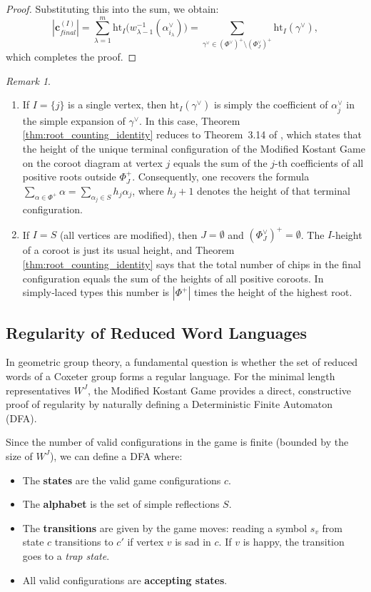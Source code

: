 \documentclass[11pt,a4paper]{amsart}
\theoremstyle{plain}
\theoremstyle{definition}
\theoremstyle{remark}
\newtheorem{remark}[theorem]{Remark}
\begin{document}
\begin{proof}
    Substituting this into the sum, we obtain:
    \[
    |\mathbf{c}_{final}^{(I)}| = \sum_{\lambda=1}^m \mathrm{ht}_I\bigl(w_{\lambda-1}^{-1}(\alpha_{i_\lambda}^\vee)\bigr) 
    = \sum_{\gamma^\vee \in (\Phi^\vee)^+ \setminus (\Phi_J^\vee)^+} \mathrm{ht}_I(\gamma^\vee),
    \]
    which completes the proof.
\end{proof}

\begin{remark}
    \label{rem:root_counting_special_cases}
    \begin{enumerate}
        \item If $I = \{j\}$ is a single vertex, then $\mathrm{ht}_I(\gamma^\vee)$ is simply the coefficient of $\alpha_j^\vee$ in the simple expansion of $\gamma^\vee$. In this case, Theorem \ref{thm:root_counting_identity} reduces to Theorem~3.14 of \cite{CaviedesCastro2022}, which states that the height of the unique terminal configuration of the Modified Kostant Game on the coroot diagram at vertex $j$ equals the sum of the $j$-th coefficients of all positive roots outside $\Phi_J^+$. Consequently, one recovers the formula $\sum_{\alpha \in \Phi^+} \alpha = \sum_{\alpha_j \in S} h_j \alpha_j$, where $h_j+1$ denotes the height of that terminal configuration.
        \item If $I = S$ (all vertices are modified), then $J = \emptyset$ and $(\Phi_J^\vee)^+ = \emptyset$. The $I$-height of a coroot is just its usual height, and Theorem \ref{thm:root_counting_identity} says that the total number of chips in the final configuration equals the sum of the heights of all positive coroots. In simply‑laced types this number is $|\Phi^+|$ times the height of the highest root.
    \end{enumerate}
\end{remark}

\subsection{Regularity of Reduced Word Languages}

In geometric group theory, a fundamental question is whether the set of reduced words of a Coxeter group forms a regular language. For the minimal length representatives $W^J$, the Modified Kostant Game provides a direct, constructive proof of regularity by naturally defining a Deterministic Finite Automaton (DFA).

Since the number of valid configurations in the game is finite (bounded by the size of $W^J$), we can define a DFA where:
\begin{itemize}
	\item The \textbf{states} are the valid game configurations $c$.
	\item The \textbf{alphabet} is the set of simple reflections $S$.
	\item The \textbf{transitions} are given by the game moves: reading a symbol $s_v$ from state $c$ transitions to $c'$ if vertex $v$ is sad in $c$. If $v$ is happy, the transition goes to a \textit{trap state}.
	\item All valid configurations are \textbf{accepting states}.
\end{itemize}
\end{document}
